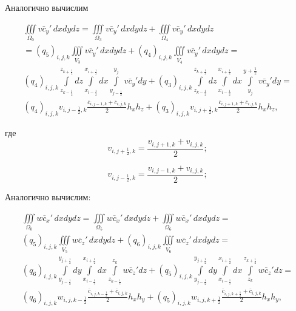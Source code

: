 \documentclass[12pt]{article}
\begin{document}
Аналогично вычислим

\begin{multline*}
	\iiint\limits_{\Omega_0} v\bar{c}_y'\,dxdydz = 
	\iiint\limits_{\Omega_3} v\bar{c}_y'\,dxdydz + 
	\iiint\limits_{\Omega_4} v\bar{c}_y'\,dxdydz \\  
	= (q_5)_{i,j,k}\iiint\limits_{V_3} v\bar{c}_y'\,dxdydz +
	 (q_4)_{i,j,k}\iiint\limits_{V_4} v\bar{c}_y'\,dxdydz = \\
	 (q_4)_{i,j,k}\int\limits_{z_{k-\frac{1}{2}}}^{z_{k+\frac{1}{2}}}dz\int\limits_{x_{i-\frac{1}{2}}}^{x_{i+\frac{1}{2}}}dx\int\limits_{y_{j-\frac{1}{2}}}^{y_j}v\bar{c}_y'dy + (q_3)_{i,j,k}\int\limits_{z_{k-\frac{1}{2}}}^{z_{k+\frac{1}{2}}}dz\int\limits_{x_{i-\frac{1}{2}}}^{x_{i+\frac{1}{2}}}dx\int\limits_{y_j}^{y+\frac{1}{2}}v\bar{c}_y'dy = \\
	 (q_4)_{i,j,k}v_{i,j-\frac{1}{2},k}\frac{\bar{c}_{i,j-1,k}+\bar{c}_{i,j,k}}{2}h_xh_z + (q_3)_{i,j,k}v_{i,j+\frac{1}{2},k}\frac{\bar{c}_{i,j+1,k}+\bar{c}_{i,j,k}}{2}h_xh_z,
\end{multline*}

где 
\begin{equation*} 
	v_{{i,j+\frac{1}{2}},k} = \frac{v_{i,j+1,k}+v_{i,j,k}}{2};
\end{equation*}

\begin{equation*} 
	v_{{i,j-\frac{1}{2}},k} = \frac{v_{i,j-1,k}+v_{i,j,k}}{2};
\end{equation*}

Аналогично вычислим:

\begin{multline*}
	\iiint\limits_{\Omega_0} w\bar{c}_x'\,dxdydz = \iiint\limits_{\Omega_5} w\bar{c}_x'\,dxdydz + \iiint\limits_{\Omega_6} w\bar{c}_x'\,dxdydz = \\
	(q_5)_{i,j,k}\iiint\limits_{V_5} w\bar{c}_z'\,dxdydz +
	(q_6)_{i,j,k}\iiint\limits_{V_6} w\bar{c}_z'\,dxdydz = \\
	(q_6)_{i,j,k}\int\limits_{y_{j-\frac{1}{2}}}^{y_{j+\frac{1}{2}}}dy\int\limits_{x_{i-\frac{1}{2}}}^{x_{i+\frac{1}{2}}}dx\int\limits_{z_{k-\frac{1}{2}}}^{z_k}w\bar{c}_z'dz + (q_5)_{i,j,k}\int\limits_{y_{j-\frac{1}{2}}}^{y_{j+\frac{1}{2}}}dy\int\limits_{x_{i-\frac{1}{2}}}^{x_{i+\frac{1}{2}}}dx\int\limits_{z_k}^{z_{k+\frac{1}{2}}}w\bar{c}_z'dz = \\
	(q_6)_{i,j,k}w_{i,j,k-\frac{1}{2}}\frac{\bar{c}_{i,j,k-\frac{1}{2}}+\bar{c}_{i,j,k}}{2}h_xh_y + (q_5)_{i,j,k}w_{i,j,k+\frac{1}{2}}\frac{\bar{c}_{i,j,k+\frac{1}{2}}+\bar{c}_{i,j,k}}{2}h_xh_y,
\end{multline*}
\end{document}
